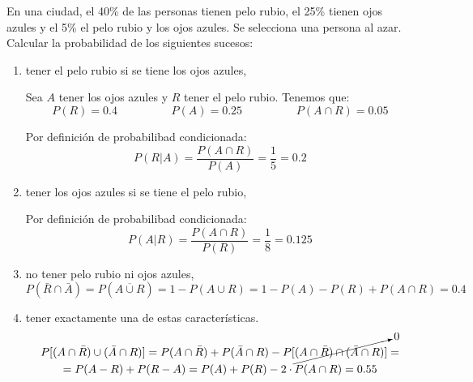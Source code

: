 \begin{ejercicio} \label{ej:4.Ejercicio3}
En una ciudad, el 40\% de las personas tienen pelo rubio, el 25\% tienen ojos azules y el 5\% el pelo rubio y los ojos azules. Se selecciona una persona al azar. Calcular la probabilidad de los siguientes sucesos:
\begin{enumerate}
    \item tener el pelo rubio si se tiene los ojos azules,

    Sea $A$ tener los ojos azules y $R$ tener el pelo rubio. Tenemos que:
    \begin{equation*}
        P(R)=0.4 \hspace{2cm} P(A)=0.25 \hspace{2cm} P(A\cap R)=0.05
    \end{equation*}

    Por definición de probabilibad condicionada:
    \begin{equation*}
        P(R|A) = \frac{P(A\cap R)}{P(A)} = \frac{1}{5} = 0.2
    \end{equation*}

    
    \item tener los ojos azules si se tiene el pelo rubio,
    
    Por definición de probabilibad condicionada:
    \begin{equation*}
        P(A|R) = \frac{P(A\cap R)}{P(R)} = \frac{1}{8} = 0.125
    \end{equation*}

    \item no tener pelo rubio ni ojos azules,
    \begin{equation*}
        P(\bar{R}\cap \bar{A})
        = P(\overline{A\cup R})
        = 1-P(A\cup R)
        = 1-P(A)-P(R) + P(A\cap R) = 0.4
    \end{equation*}
    
    \item tener exactamente una de estas características.
    \begin{multline*}
        P[(A\cap \bar{R}) \cup (\bar{A} \cap R)]
        = P(A\cap \bar{R}) + P(\bar{A} \cap R) -P[\cancelto{0}{(A\cap \bar{R}) \cap (\bar{A} \cap R)]}
        =\\= P(A-R) +P(R-A) = P(A) + P(R) -2\cdot P(A\cap R) = 0.55
    \end{multline*}
\end{enumerate}
    
\end{ejercicio}

